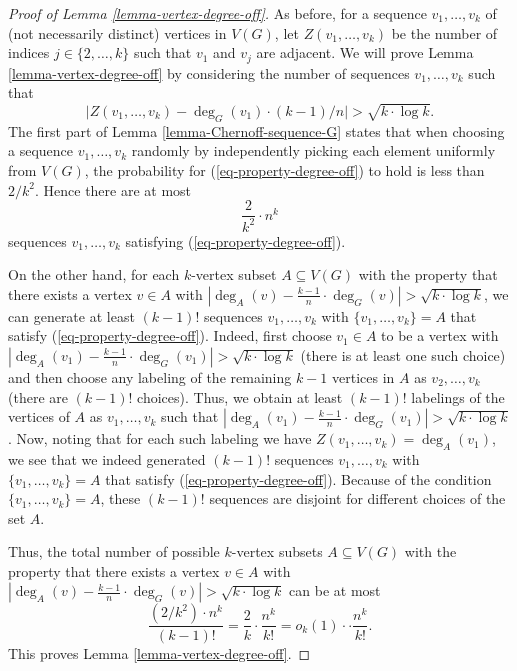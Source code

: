 \begin{proof}[Proof of Lemma \ref{lemma-vertex-degree-off}]As before, for a sequence $v_1,\dots, v_k$ of (not necessarily distinct) vertices in $V(G)$, let $Z(v_1,\dots,v_k)$ be the number of indices $j\in \lbrace 2,\dots,k\rbrace$ such that $v_1$ and $v_j$ are adjacent. We will prove Lemma \ref{lemma-vertex-degree-off} by considering the number of sequences $v_1,\dots, v_k$ such that
\begin{equation}\label{eq-property-degree-off}
\vert Z(v_1,\dots,v_k)-\deg_G(v_1)\cdot (k-1)/n\vert> \sqrt{k\cdot \log k}.
\end{equation}
The first part of Lemma \ref{lemma-Chernoff-sequence-G} states that when choosing a sequence $v_1,\dots,v_k$ randomly by independently picking each element uniformly from $V(G)$, the probability for (\ref{eq-property-degree-off}) to hold is less than $2/k^2$. Hence there are at most
\[\frac{2}{k^2}\cdot n^k\]
sequences $v_1,\dots, v_k$ satisfying (\ref{eq-property-degree-off}).

On the other hand, for each $k$-vertex subset $A\subseteq V(G)$ with the property that there exists a vertex $v\in A$ with $\left\vert\deg_A(v)-\frac{k-1}{n}\cdot \deg_G(v)\right\vert>\sqrt{k\cdot \log k}$, we can generate at least $(k-1)!$ sequences $v_1,\dots, v_k$ with $\lbrace v_1,\dots,v_k\rbrace=A$ that satisfy (\ref{eq-property-degree-off}). Indeed, first choose $v_1\in A$ to be a vertex with $\left\vert\deg_A(v_1)-\frac{k-1}{n}\cdot \deg_G(v_1)\right\vert>\sqrt{k\cdot \log k}$ (there is at least one such choice) and then choose any labeling of the remaining $k-1$ vertices in $A$ as $v_2, \dots,v_k$ (there are $(k-1)!$ choices). Thus, we obtain at least $(k-1)!$ labelings of the vertices of $A$ as $v_1,\dots, v_k$ such that $\left\vert\deg_A(v_1)-\frac{k-1}{n}\cdot \deg_G(v_1)\right\vert>\sqrt{k\cdot \log k}$. Now, noting that for each such labeling we have $Z(v_1,\dots,v_k)=\deg_A(v_1)$, we see that we indeed generated $(k-1)!$ sequences $v_1,\dots, v_k$ with $\lbrace v_1,\dots,v_k\rbrace=A$ that satisfy (\ref{eq-property-degree-off}). Because of the condition $\lbrace v_1,\dots,v_k\rbrace=A$, these $(k-1)! $ sequences are disjoint for different choices of the set $A$.

Thus, the total number of possible $k$-vertex subsets $A\subseteq V(G)$ with the property that there exists a vertex $v\in A$ with $\left\vert\deg_A(v)-\frac{k-1}{n}\cdot \deg_G(v)\right\vert>\sqrt{k\cdot \log k}$ can be at most
\[\frac{(2/k^2)\cdot n^k}{(k-1)!}=\frac{2}{k}\cdot \frac{n^k}{k!}=o_k(1)\cdot \cdot \frac{n^k}{k!}.\]
This proves Lemma \ref{lemma-vertex-degree-off}.
\end{proof}

